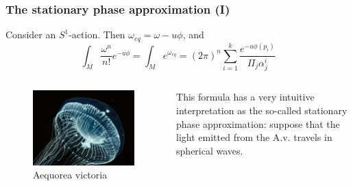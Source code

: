 \documentclass{beamer}
\begin{document}
\begin{frame}
\frametitle{The stationary phase approximation (I)}
Consider an $S^1$-action. Then $\omega_{eq}=\omega-u\phi$, and
\[
\int_M\frac{\omega^n}{n!}e^{-u\phi}=\int_Me^{\omega_{eq}}=(2\pi)^n\sum_{i=1}^k\frac{e^{-u\phi(p_i)}}{\Pi_{j}\alpha^i_j}
\]
\begin{columns}[c]
\begin{figure}
\includegraphics[width=0.9\linewidth]{medusasenzarif}
\caption{Aequorea victoria}
\end{figure}

This formula has a very intuitive interpretation as the so-called stationary phase approximation: suppose that the light emitted from the A.v. travels in spherical waves.

\end{columns}
\end{frame}

\end{document}
